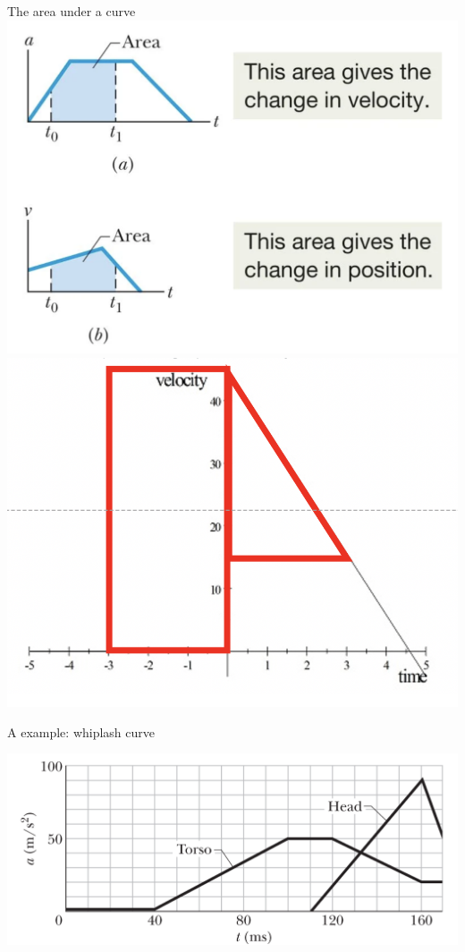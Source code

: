 \begin{frame}{The area under a curve}
\notsotiny
\includegraphics[scale=0.3]{area-under-curve}
\includegraphics[scale=0.3]{area-under-curve-2}
\end{frame}


\begin{frame}{A example: whiplash curve}
\notsotiny

\includegraphics[scale=0.3]{whiplash2}
\end{frame}




